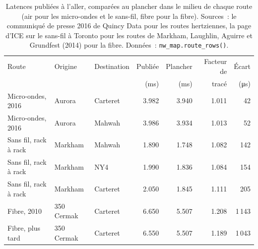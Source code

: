 \begin{table}[ht]
\centering\small
\begin{tabular}{lllrrrr}
\toprule
Route & Origine & Destination & Publiée & Plancher & Facteur de & Écart \\
 & & & (ms) & (ms) & tracé & (\si{\micro\second}) \\
\midrule
Micro-ondes, 2016 & Aurora & Carteret & 3.982 & 3.940 & 1.011 & 42 \\
Micro-ondes, 2016 & Aurora & Mahwah & 3.986 & 3.934 & 1.013 & 52 \\
Sans fil, rack à rack & Markham & Mahwah & 1.890 & 1.748 & 1.082 & 142 \\
Sans fil, rack à rack & Markham & NY4 & 1.990 & 1.836 & 1.084 & 154 \\
Sans fil, rack à rack & Markham & Carteret & 2.050 & 1.845 & 1.111 & 205 \\
Fibre, 2010 & 350 Cermak & Carteret & 6.650 & 5.507 & 1.208 & 1\,143 \\
Fibre, plus tard & 350 Cermak & Carteret & 6.550 & 5.507 & 1.189 & 1\,043 \\
\bottomrule
\end{tabular}
\caption{Latences publiées à l'aller, comparées au plancher dans le milieu de chaque route (air pour les micro-ondes et le sans-fil, fibre pour la fibre). Sources~:
le communiqué de presse 2016 de Quincy Data pour les routes hertziennes, la page d'ICE sur le sans-fil à Toronto pour les routes de Markham, Laughlin, Aguirre et Grundfest
(2014) pour la fibre. Données~: \texttt{nw\_map.route\_rows()}.}\label{tab:nw:the-north-american-map:routes}
\end{table}

\label{lst:nw:the-north-american-map:routes}

